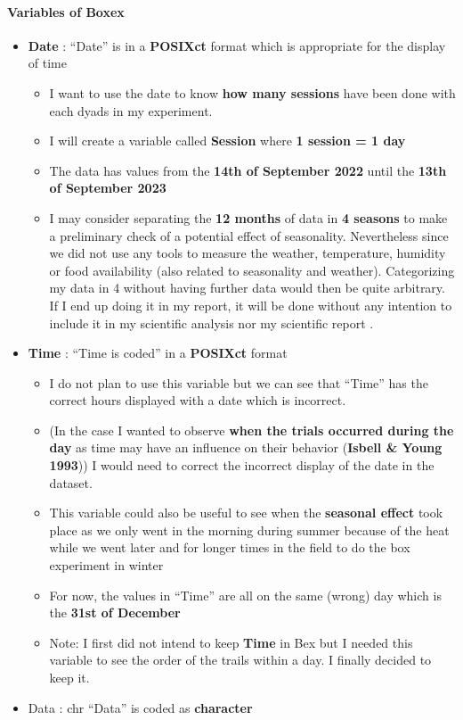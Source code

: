 \documentclass[
]{article}
\providecommand{\tightlist}{%
  \setlength{\itemsep}{0pt}\setlength{\parskip}{0pt}}
\begin{document}
\hypertarget{variables-of-boxex}{%
\paragraph{Variables of Boxex}\label{variables-of-boxex}}

\begin{itemize}
\item
  \textbf{Date} : ``Date'' is in a \textbf{POSIXct} format which is
  appropriate for the display of time

  \begin{itemize}
  \tightlist
  \item
    I want to use the date to know \textbf{how many sessions} have been
    done with each dyads in my experiment.
  \item
    I will create a variable called \textbf{Session} where \textbf{1
    session = 1 day}
  \item
    The data has values from the \textbf{14th of September 2022} until
    the \textbf{13th of September 2023}
  \item
    I may consider separating the \textbf{12 months} of data in
    \textbf{4 seasons} to make a preliminary check of a potential effect
    of seasonality. Nevertheless since we did not use any tools to
    measure the weather, temperature, humidity or food availability
    (also related to seasonality and weather). Categorizing my data in 4
    without having further data would then be quite arbitrary. If I end
    up doing it in my report, it will be done without any intention to
    include it in my scientific analysis nor my scientific report .
  \end{itemize}
\item
  \textbf{Time} : ``Time is coded'' in a \textbf{POSIXct} format

  \begin{itemize}
  \tightlist
  \item
    I do not plan to use this variable but we can see that ``Time'' has
    the correct hours displayed with a date which is incorrect.
  \item
    (In the case I wanted to observe \textbf{when the trials occurred
    during the day} as time may have an influence on their behavior
    (\textbf{Isbell \& Young 1993})) I would need to correct the
    incorrect display of the date in the dataset.
  \item
    This variable could also be useful to see when the \textbf{seasonal
    effect} took place as we only went in the morning during summer
    because of the heat while we went later and for longer times in the
    field to do the box experiment in winter
  \item
    For now, the values in ``Time'' are all on the same (wrong) day
    which is the \textbf{31st of December}
  \item
    Note: I first did not intend to keep \textbf{Time} in Bex but I
    needed this variable to see the order of the trails within a day. I
    finally decided to keep it.
  \end{itemize}
\item
  Data : chr ``Data'' is coded as \textbf{character}


\end{itemize}
\end{document}
